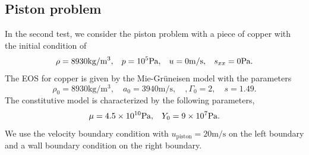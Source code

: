 \documentclass{article}
\numberwithin{equation}{section}
\numberwithin{table}{section}
\begin{document}
\subsection{Piston problem}
In the second test, we consider the  piston problem \cite{maire2007cell} with a piece of copper with the initial condition of
\begin{equation}
  \rho = 8930 \text{kg}/\text{m}^3, \hspace{0.3cm}  p = 10^5 \text{Pa}, \hspace{0.3cm}  u = 0 \text{m}/\text{s},\hspace{0.3cm}  s_{xx} = 0 \text{Pa}.
\end{equation}
The EOS for copper is given by  the Mie-Gr\"uneisen model with the parameters
\begin{equation}
  \rho_0 = 8930 \text{kg}/\text{m}^3, \quad a_0 = 3940\text{m}/\text{s}, \quad , \Gamma_0 = 2, \quad  s = 1.49.
\end{equation}
The constitutive model is characterized by the following parameters,
\begin{equation}
  \mu = 4.5\times 10^{10}\text{Pa}, \hspace{0.3cm} Y_0 = 9\times 10^7 \text{Pa}.
\end{equation}
We use the velocity boundary condition with $u_{\text{piston}} = 20 \text{m}/\text{s}$ on the left boundary  and a  wall boundary condition on the right boundary.
\end{document}
